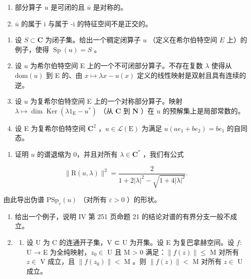 \begin{enumerate}
\def\labelenumi{\alph{enumi})}
\item
  部分算子 \(u\) 是可闭的且 \(\overline{u}\) 是对称的。
\item
  \(\overline{u}\) 的属于 i 与属于 -i 的特征空间不是正交的。
\end{enumerate}

\begin{enumerate}
\def\labelenumi{\arabic{enumi})}
\setcounter{enumi}{11}
\item
  设 \(S \subset \mathbf{C}\) 为闭子集。给出一个稠定闭算子 \(u\) （定义在希尔伯特空间 \(E\) 上）的例子，使得 \(\operatorname{Sp}(u) = S\) 。
\item
  设 \(u\) 为希尔伯特空间 E 上的一个不可闭部分算子。不存在复数 \(\lambda\) 使得从 \(\text{dom}(u)\) 到 E 的、由 \(x \mapsto \lambda x - u(x)\) 定义的线性映射是双射且具有连续的逆。
\item
  设 \(u\) 为复希尔伯特空间 E 上的一个对称部分算子。映射 \(\lambda \mapsto \dim \operatorname{Ker}(\lambda 1_{\mathrm{E}} - u^{*})\) （从 \(\mathbf{C}\) 到 \(\overline{\mathbf{N}}\) ）在 \(u\) 的预解集上是局部常数的。
\item
  设 E 为复希尔伯特空间 \(\mathbf{C}^2\) ，\(u \in \mathcal{L}(\mathrm{E})\) 为满足 \(u(ae_1 + be_2) = be_1\) 的自同态。
\end{enumerate}

\begin{enumerate}
\def\labelenumi{\alph{enumi})}
\tightlist
\item
  证明 \(u\) 的谱退缩为 0，并且对所有 \(\lambda \in \mathbf{C}^*\) ，我们有公式
\end{enumerate}

\[
\| \mathrm{R} (u, \lambda) \| ^ {2} = \frac {2}{1 + 2 | \lambda | ^ {2} - \sqrt {1 + 4 | \lambda | ^ {2}}}.
\]

由此导出伪谱 \(\mathrm{PSp}_{\varepsilon}(u)\) （对所有 \(\varepsilon > 0\) ）的形状。

\begin{enumerate}
\def\labelenumi{\arabic{enumi})}
\setcounter{enumi}{15}
\item
  给出一个例子，说明 IV 第 251 页命题 21 的结论对谱的有界分支一般不成立。
\item
  \begin{enumerate}
  \def\labelenumii{\alph{enumii})}
  \tightlist
  \item
    设 U 为 C 的连通开子集，V ⊂ U 为开集。设 E 为复巴拿赫空间。设 \(f\colon\) U → E 为全纯映射，\(z_0 \in\) U 且 M \textgreater{} 0 满足：\(\|f(z)\| \leqslant\) M 对所有 \(z \in\) V 成立，且 \(\|f(z_0)\| <\) M 。则 \(\|f(z)\| <\) M 对所有 \(z \in\) U 成立。
  \end{enumerate}
\end{enumerate}

